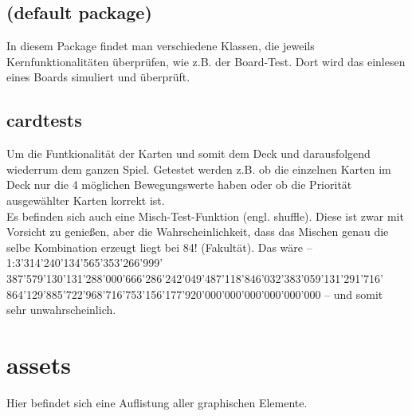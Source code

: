 \documentclass[12pt,a4paper,oneside]{book}
\theoremstyle{plain}
\numberwithin{equation}{chapter} \DeclareMathOperator{\Var}{Var}
\begin{document}
\section{(default package)}
    In diesem Package findet man verschiedene Klassen, die jeweils Kernfunktionalitäten überprüfen, wie z.B. der Board-Test. Dort wird das einlesen eines Boards simuliert und überprüft.

\section{cardtests}
    Um die Funtkionalität der Karten und somit dem Deck und darausfolgend wiederrum dem ganzen Spiel. Getestet werden z.B. ob die einzelnen Karten im Deck nur die 4 möglichen Bewegungswerte haben oder ob die Priorität ausgewählter Karten korrekt ist. \\
    Es befinden sich auch eine Misch-Test-Funktion (engl. shuffle). Diese ist zwar mit Vorsicht zu genießen, aber die Wahrscheinlichkeit, dass das Mischen genau die selbe Kombination erzeugt liegt bei 84! (Fakultät). Das wäre -- 1:3'314'240'134'565'353'266'999' 387'579'130'131'288'000'666'286'242'049'487'118'846'032'383'059'131'291'716' 864'129'885'722'968'716'753'156'177'920'000'000'000'000'000'000 -- und somit \\ sehr unwahrscheinlich.

\chapter{assets}
    Hier befindet sich eine Auflistung aller graphischen Elemente.
\end{document}
